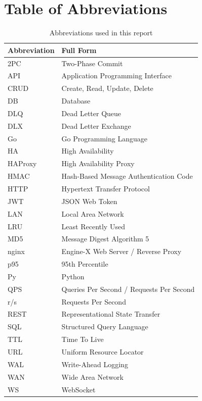 \documentclass[11pt,a4paper]{article}
\begin{document}
\section*{Table of Abbreviations}

\begin{table}[H]
\centering\small
\begin{tabularx}{\textwidth}{L{3cm} X}
\toprule
\textbf{Abbreviation} & \textbf{Full Form} \\
\midrule
2PC   & Two-Phase Commit \\
API   & Application Programming Interface \\
CRUD  & Create, Read, Update, Delete \\
DB    & Database \\
DLQ   & Dead Letter Queue \\
DLX   & Dead Letter Exchange \\
Go    & Go Programming Language \\
HA    & High Availability \\
HAProxy & High Availability Proxy \\
HMAC  & Hash-Based Message Authentication Code \\
HTTP  & Hypertext Transfer Protocol \\
JWT   & JSON Web Token \\
LAN   & Local Area Network \\
LRU   & Least Recently Used \\
MD5   & Message Digest Algorithm 5 \\
nginx & Engine-X Web Server / Reverse Proxy \\
p95   & 95th Percentile \\
Py    & Python \\
QPS   & Queries Per Second / Requests Per Second \\
r/s   & Requests Per Second \\
REST  & Representational State Transfer \\
SQL   & Structured Query Language \\
TTL   & Time To Live \\
URL   & Uniform Resource Locator \\
WAL   & Write-Ahead Logging \\
WAN   & Wide Area Network \\
WS    & WebSocket \\
\bottomrule
\end{tabularx}
\caption{Abbreviations used in this report}
\label{tab:abbreviations}
\end{table}
\end{document}
